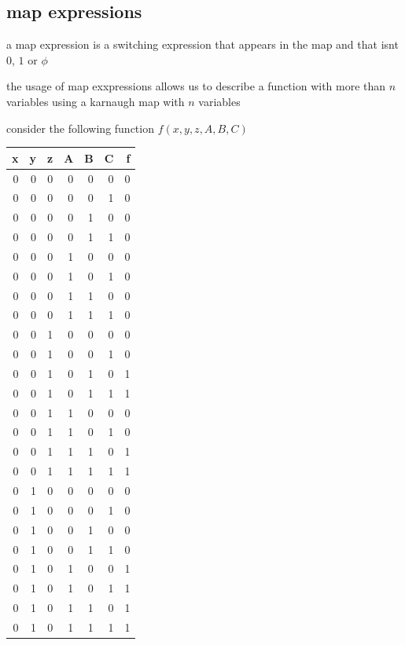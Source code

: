 \documentclass[a4paper,12pt]{article}
\begin{document}
\subsection{map expressions}
\label{sec:org06f3bb0}
\begin{definition}
a map expression is a switching expression that appears in the map and that isnt \(0\), \(1\) or \(\phi\)\\
\begin{characteristic}
the usage of map exxpressions allows us to describe a function with more than \(n\) variables using a karnaugh map with \(n\) variables\\
\end{characteristic}
\begin{my_example}
consider the following function \(f(x,y,z,A,B,C)\)\\
\begin{tabular}{rrrrrrr}
x & y & z & A & B & C & f\\
\hline
0 & 0 & 0 & 0 & 0 & 0 & 0\\
0 & 0 & 0 & 0 & 0 & 1 & 0\\
0 & 0 & 0 & 0 & 1 & 0 & 0\\
0 & 0 & 0 & 0 & 1 & 1 & 0\\
0 & 0 & 0 & 1 & 0 & 0 & 0\\
0 & 0 & 0 & 1 & 0 & 1 & 0\\
0 & 0 & 0 & 1 & 1 & 0 & 0\\
0 & 0 & 0 & 1 & 1 & 1 & 0\\
0 & 0 & 1 & 0 & 0 & 0 & 0\\
0 & 0 & 1 & 0 & 0 & 1 & 0\\
0 & 0 & 1 & 0 & 1 & 0 & 1\\
0 & 0 & 1 & 0 & 1 & 1 & 1\\
0 & 0 & 1 & 1 & 0 & 0 & 0\\
0 & 0 & 1 & 1 & 0 & 1 & 0\\
0 & 0 & 1 & 1 & 1 & 0 & 1\\
0 & 0 & 1 & 1 & 1 & 1 & 1\\
0 & 1 & 0 & 0 & 0 & 0 & 0\\
0 & 1 & 0 & 0 & 0 & 1 & 0\\
0 & 1 & 0 & 0 & 1 & 0 & 0\\
0 & 1 & 0 & 0 & 1 & 1 & 0\\
0 & 1 & 0 & 1 & 0 & 0 & 1\\
0 & 1 & 0 & 1 & 0 & 1 & 1\\
0 & 1 & 0 & 1 & 1 & 0 & 1\\
0 & 1 & 0 & 1 & 1 & 1 & 1\\

\end{tabular}
\end{my_example}
\end{definition}
\end{document}
